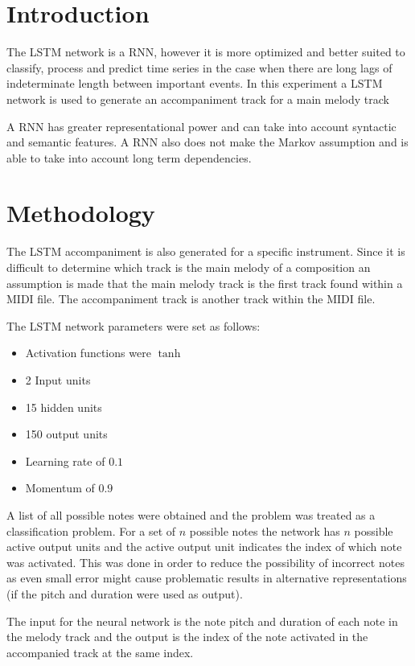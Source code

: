 \section{Introduction}
The \ac{LSTM} network is a \acf{RNN}, however it is more optimized and better suited to classify, process and predict time series in the case when there are long lags of indeterminate length between important events. In this experiment a \ac{LSTM} network is used to generate an accompaniment track for a main melody track

A \ac{RNN} has greater representational power and can take into account syntactic and semantic features. A \ac{RNN} also does not make the Markov assumption and is able to take into account long term dependencies.

\section{Methodology}
The \ac{LSTM} accompaniment is also generated for a specific instrument. 
Since it is difficult to determine which track is the main melody of a composition an assumption is made that the main melody track is the first track found within a \ac{MIDI} file. The accompaniment track is another track within the \ac{MIDI} file.

The LSTM network parameters were set as follows:
\begin{itemize}
\item Activation functions were $\tanh$
\item 2 Input units
\item 15 hidden units
\item 150 output units
\item Learning rate of $0.1$
\item Momentum of $0.9$
\end{itemize}

A list of all possible notes were obtained and the problem was treated as a classification problem. For a set of $n$ possible notes the network has $n$ possible active output units and the active output unit indicates the index of which note was activated. This was done in order to reduce the possibility of incorrect notes as even small error might cause problematic results in alternative representations (if the pitch and duration were used as output).

The input for the neural network is the note pitch and duration of each note in the melody track and the output is the index of the note activated in the accompanied track at the same index. 


